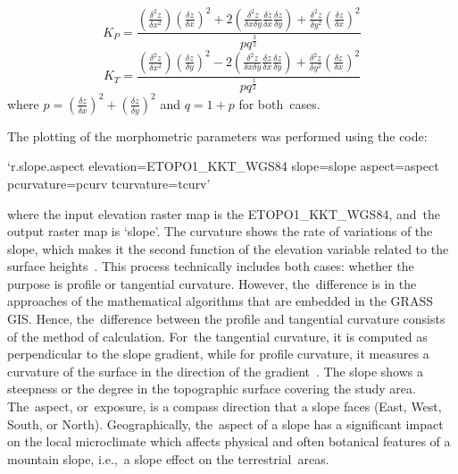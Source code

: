 \documentclass[technologies,article,accept,pdftex,moreauthors]{Definitions/mdpi}
\begin{document}
\begin{equation}
  \label{pc}
 K_P=\frac{\left(\frac{\delta^2 z}{\delta x^2}\right) \left(\frac{\delta z}{\delta x}\right)^2 + 2\left(\frac{\delta^2 z}{\delta x \delta y}\frac{\delta z}{\delta x}\frac{\delta z}{\delta y} \right) + \frac{\delta^2 z}{\delta y^2} \left(\frac{\delta z}{\delta x}\right)^2}{pq^\frac{3}{2}}
\end{equation}
\begin{equation}
  \label{tc}
 K_T=\frac{\left(\frac{\delta^2 z}{\delta x^2}\right) \left(\frac{\delta z}{\delta y}\right)^2 - 2\left(\frac{\delta^2 z}{\delta x \delta y}\frac{\delta z}{\delta x}\frac{\delta z}{\delta y} \right) + \frac{\delta^2 z}{\delta y^2} \left(\frac{\delta z}{\delta x}\right)^2}{pq^\frac{1}{2}}
\end{equation}
where $p=\left(\frac{\delta z}{\delta x}\right)^2+\left(\frac{\delta z}{\delta y}\right)^2$ and $q=1+p$ for both~cases.

The plotting {of the morphometric parameters }was performed using the code: 

\begin{spverbatim}
‘r.slope.aspect elevation=ETOPO1_KKT_WGS84 slope=slope aspect=aspect 
pcurvature=pcurv tcurvature=tcurv’
\end{spverbatim}
\vspace{6pt}
\noindent where the input elevation raster map is the ETOPO1\_KKT\_WGS84, and~the output raster map is ‘slope’. {The curvature} shows the rate of variations of the slope, which makes it the second function of the elevation variable related to the surface heights~\cite{Schmidt}. This process{ }technically {includes} both cases: whether the purpose is profile or tangential curvature. However, the~difference is in the approaches of the mathematical algorithms that are embedded in the GRASS GIS. Hence, the~difference between the profile and tangential curvature consists of the method of calculation. For~the tangential curvature, it is computed as perpendicular to the slope gradient, while for profile curvature, it measures a curvature of the surface in the direction of the gradient~\cite{Gallant}. {The slope} shows a steepness or the degree in the topographic surface covering the study area. The~aspect, or~exposure, is a compass direction that a slope faces (East, West, South, or North). Geographically, the~aspect of a slope has a significant impact on the local microclimate which affects physical and often botanical features of a mountain slope, i.e.,~a slope effect on the terrestrial~areas. 
\end{document}
